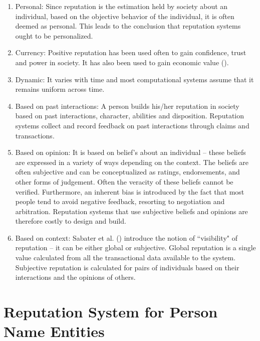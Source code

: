 \documentclass[a4paper,man,natbib]{apa6}
\begin{document}
\begin{enumerate}
\item Personal: Since reputation is the estimation held by society about an individual, based on the objective behavior of the individual, it is often deemed as personal. This leads to the conclusion that reputation systems ought to be personalized. %

\item Currency: Positive reputation has been used often to gain confidence, trust and power in society. It has also been used to gain economic value (\cite{Resnick_06a}). 

\item Dynamic: It varies with time and most computational systems assume that it remains uniform across time.

\item Based on past interactions: A person builds his/her reputation in society based on past interactions, character, abilities and disposition. Reputation systems collect and record feedback on past interactions through claims and transactions.

\item Based on opinion: It is based on belief's about an individual -- these beliefs are expressed in a variety of ways depending on the context. The beliefs are often subjective and can be conceptualized as ratings, endorsements, and other forms of judgement. Often the veracity of these beliefs cannot be verified. Furthermore, an inherent bias is introduced by the fact that most people tend to avoid negative feedback, resorting to negotiation and arbitration. Reputation systems that use subjective beliefs and opinions are therefore costly to design and build. 

\item Based on context: Sabater et al. (\cite{Sabater_05}) introduce the notion of ``visibility" of reputation -- it can be either global or subjective. Global reputation is a single value calculated from all the transactional data available to the system. Subjective reputation is calculated for pairs of individuals based on their interactions and the opinions of others.

\end{enumerate}



\section{Reputation System for Person Name Entities}
\label{pnRep}
\end{document}
